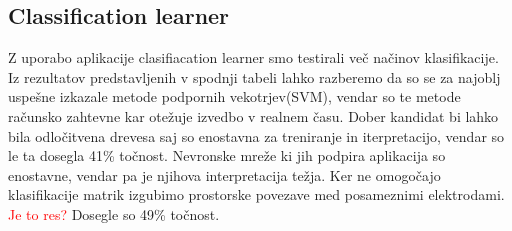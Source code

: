 \subsection{Classification learner}
Z uporabo aplikacije clasifiacation learner smo testirali več načinov klasifikacije. Iz rezultatov predstavljenih v spodnji tabeli lahko razberemo da so se za najoblj uspešne izkazale metode podpornih vekotrjev(SVM), vendar so te metode računsko zahtevne kar otežuje izvedbo v realnem času. Dober kandidat bi lahko bila odločitvena drevesa saj so enostavna za treniranje in iterpretacijo, vendar so le ta dosegla 41\% točnost. Nevronske mreže ki jih podpira aplikacija so enostavne, vendar pa je njihova interpretacija težja. Ker ne omogočajo klasifikacije matrik izgubimo prostorske povezave med posameznimi elektrodami. \textcolor{red}{Je to res?} Dosegle so 49\% točnost.
